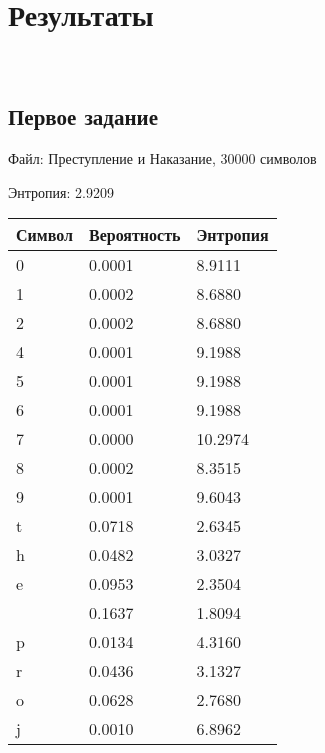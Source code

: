\documentclass[12pt, a4paper]{article}
\begin{document}
\section*{Результаты}\
\subsection*{Первое задание}
Файл: Преступление и Наказание, 30000 символов

Энтропия: 2.9209

\begin{tabular}{ | l | l | l | }

\hline

Символ & Вероятность & Энтропия \\

\hline

0 & 0.0001 & 8.9111 \\

1 & 0.0002 & 8.6880 \\

2 & 0.0002 & 8.6880 \\

4 & 0.0001 & 9.1988 \\

5 & 0.0001 & 9.1988 \\

6 & 0.0001 & 9.1988 \\

7 & 0.0000 & 10.2974 \\

8 & 0.0002 & 8.3515 \\

9 & 0.0001 & 9.6043 \\

t & 0.0718 & 2.6345 \\

h & 0.0482 & 3.0327 \\

e & 0.0953 & 2.3504 \\

& 0.1637 & 1.8094 \\

p & 0.0134 & 4.3160 \\

r & 0.0436 & 3.1327 \\

o & 0.0628 & 2.7680 \\

j & 0.0010 & 6.8962 \\


\end{tabular}
\end{document}
